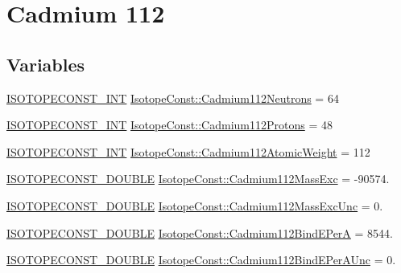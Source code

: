 \hypertarget{group___isotope_const-_cadmium-_cd112}{}\section{Cadmium 112}
\label{group___isotope_const-_cadmium-_cd112}
\subsection*{Variables}
\begin{DoxyCompactItemize}
\item 
\mbox{\hyperlink{group___isotope_const-_macros_ga5f18360b3e99483a35c32d789e62621c}{I\+S\+O\+T\+O\+P\+E\+C\+O\+N\+S\+T\+\_\+\+I\+NT}} \mbox{\hyperlink{group___isotope_const-_cadmium-_cd112_ga5904b6e551bbe91e38012d3efa6eddb9}{Isotope\+Const\+::\+Cadmium112\+Neutrons}} = 64
\item 
\mbox{\hyperlink{group___isotope_const-_macros_ga5f18360b3e99483a35c32d789e62621c}{I\+S\+O\+T\+O\+P\+E\+C\+O\+N\+S\+T\+\_\+\+I\+NT}} \mbox{\hyperlink{group___isotope_const-_cadmium-_cd112_gaad20f4927629ce939cc49409efa9d414}{Isotope\+Const\+::\+Cadmium112\+Protons}} = 48
\item 
\mbox{\hyperlink{group___isotope_const-_macros_ga5f18360b3e99483a35c32d789e62621c}{I\+S\+O\+T\+O\+P\+E\+C\+O\+N\+S\+T\+\_\+\+I\+NT}} \mbox{\hyperlink{group___isotope_const-_cadmium-_cd112_gaef120b495350e4a0fe41f498f935cd92}{Isotope\+Const\+::\+Cadmium112\+Atomic\+Weight}} = 112
\item 
\mbox{\hyperlink{group___isotope_const-_macros_ga8f45a7272ce02c0b4c65c44636ed719a}{I\+S\+O\+T\+O\+P\+E\+C\+O\+N\+S\+T\+\_\+\+D\+O\+U\+B\+LE}} \mbox{\hyperlink{group___isotope_const-_cadmium-_cd112_gaae8187c9298fa76b535fd5865805d73a}{Isotope\+Const\+::\+Cadmium112\+Mass\+Exc}} = -\/90574.
\item 
\mbox{\hyperlink{group___isotope_const-_macros_ga8f45a7272ce02c0b4c65c44636ed719a}{I\+S\+O\+T\+O\+P\+E\+C\+O\+N\+S\+T\+\_\+\+D\+O\+U\+B\+LE}} \mbox{\hyperlink{group___isotope_const-_cadmium-_cd112_ga9707c659e584971be877f01a3810942b}{Isotope\+Const\+::\+Cadmium112\+Mass\+Exc\+Unc}} = 0.
\item 
\mbox{\hyperlink{group___isotope_const-_macros_ga8f45a7272ce02c0b4c65c44636ed719a}{I\+S\+O\+T\+O\+P\+E\+C\+O\+N\+S\+T\+\_\+\+D\+O\+U\+B\+LE}} \mbox{\hyperlink{group___isotope_const-_cadmium-_cd112_gabc3a330879126238bcd4897e162f870c}{Isotope\+Const\+::\+Cadmium112\+Bind\+E\+PerA}} = 8544.
\item 
\mbox{\hyperlink{group___isotope_const-_macros_ga8f45a7272ce02c0b4c65c44636ed719a}{I\+S\+O\+T\+O\+P\+E\+C\+O\+N\+S\+T\+\_\+\+D\+O\+U\+B\+LE}} \mbox{\hyperlink{group___isotope_const-_cadmium-_cd112_gac9543ee3ddc8f2ec165741b55e0d5426}{Isotope\+Const\+::\+Cadmium112\+Bind\+E\+Per\+A\+Unc}} = 0.

\end{DoxyCompactItemize}
